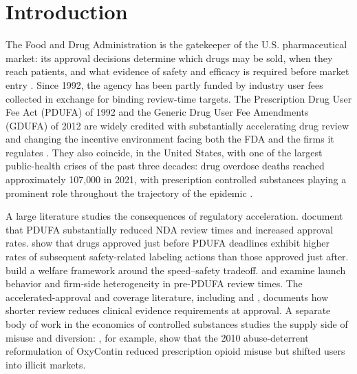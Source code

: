 \section{Introduction}

The Food and Drug Administration is the gatekeeper of the U.S. pharmaceutical market: its approval decisions determine which drugs may be sold, when they reach patients, and what evidence of safety and efficacy is required before market entry \parencite{carpenterINTRODUCTIONGatekeeper2010}. Since 1992, the agency has been partly funded by industry user fees collected in exchange for binding review-time targets. The Prescription Drug User Fee Act (PDUFA) of 1992 and the Generic Drug User Fee Amendments (GDUFA) of 2012 are widely credited with substantially accelerating drug review and changing the incentive environment facing both the FDA and the firms it regulates \parencite{berndtIndustryFundingFDA2005, olsonPDUFAInitialUS2009, berndtGenericDrugUser2018}. They also coincide, in the United States, with one of the largest public-health crises of the past three decades: drug overdose deaths reached approximately 107{,}000 in 2021, with prescription controlled substances playing a prominent role throughout the trajectory of the epidemic \parencite{markDrugOverdoseDeaths2024}.

A large literature studies the consequences of regulatory acceleration. \textcite{berndtIndustryFundingFDA2005} document that PDUFA substantially reduced NDA review times and increased approval rates. \textcite{carpenterDrugreviewDeadlinesSafety2008} show that drugs approved just before PDUFA deadlines exhibit higher rates of subsequent safety-related labeling actions than those approved just after. \textcite{philipsonCostbenefitAnalysisFDA2008} build a welfare framework around the speed--safety tradeoff. \textcite{olsonPDUFAInitialUS2009} and \textcite{olsonFirmCharacteristicsSpeed1997} examine launch behavior and firm-side heterogeneity in pre-PDUFA review times. The accelerated-approval and coverage literature, including \textcite{darrowFDAApprovalRegulation2020} and \textcite{gelladAcceleratedApprovalExpensive2017}, documents how shorter review reduces clinical evidence requirements at approval. A separate body of work in the economics of controlled substances studies the supply side of misuse and diversion: \textcite{alpertSupplySideDrugPolicy2018a}, for example, show that the 2010 abuse-deterrent reformulation of OxyContin reduced prescription opioid misuse but shifted users into illicit markets.

